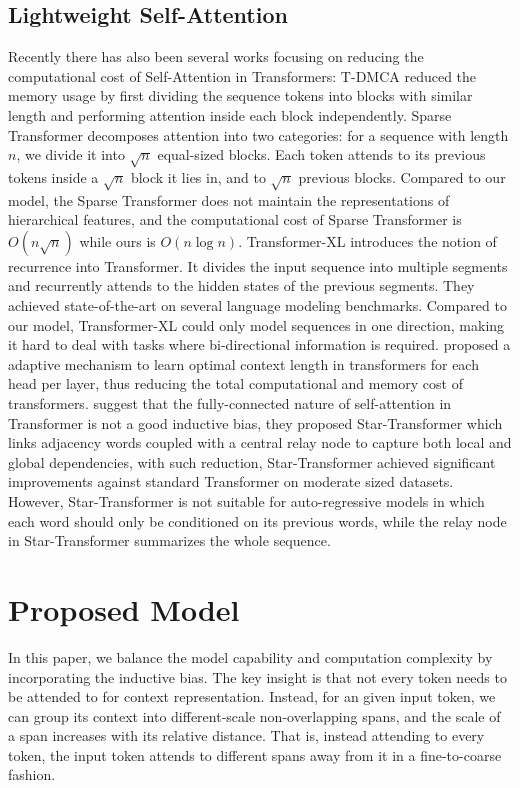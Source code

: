 \documentclass[11pt,a4paper]{article}
\begin{document}
\subsection{Lightweight Self-Attention }
Recently there has also been several works focusing on reducing the computational cost of Self-Attention in Transformers: T-DMCA \citep{LiuSPGSKS18} reduced the memory usage by first dividing the sequence tokens into blocks with similar length and performing attention inside each block independently. Sparse Transformer \citep{child2019sparsetransformer} decomposes attention into two categories: for a sequence with length $n$, we divide it into $\sqrt{n}$ equal-sized blocks. Each token attends to its previous tokens inside a $\sqrt{n}$ block it lies in, and to $\sqrt{n}$ previous blocks. Compared to our model, the Sparse Transformer does not maintain the representations of hierarchical features, and the computational cost of Sparse Transformer is $O(n\sqrt{n})$ while ours is $O(n\log n)$.
 Transformer-XL \citep{dai2019transformer} introduces the notion of recurrence into Transformer. It divides the input sequence into multiple segments and recurrently attends to the hidden states of the previous segments. They achieved state-of-the-art on several language modeling benchmarks. Compared to our model, Transformer-XL could only model sequences in one direction, making it hard to deal with tasks where bi-directional information is required. \citet{sukhbaatar2019adaptive} proposed a adaptive mechanism to learn optimal context length in transformers for each head per layer, thus reducing the total computational and memory cost of transformers. \citet{guo2019startransformer} suggest that the fully-connected nature of self-attention in Transformer is not a good inductive bias, they proposed Star-Transformer which links adjacency words coupled with a central relay node to capture both local and global dependencies, with such reduction, Star-Transformer achieved significant improvements against standard Transformer on moderate sized datasets. However, Star-Transformer is not suitable for auto-regressive models in which each word should only be conditioned on its previous words, while the relay node in Star-Transformer summarizes the whole sequence.



\section{Proposed Model}

In this paper, we balance the model capability and computation complexity by incorporating the inductive bias. The key insight is that not every token needs to be attended to for context representation. Instead, for an given input token, we can group its context into different-scale non-overlapping spans, and the scale of a span increases with its relative distance. That is, instead attending to every token, the input token attends to different spans away from it in a fine-to-coarse fashion.
\end{document}
